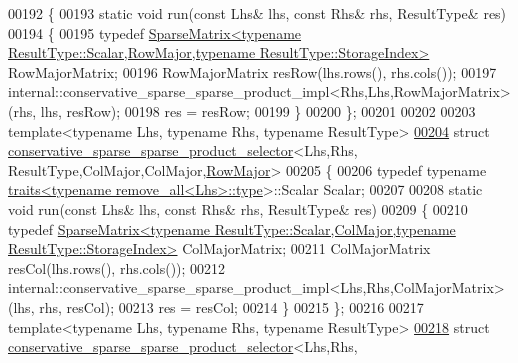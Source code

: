 \begin{DoxyCode}
00192 \{
00193   \textcolor{keyword}{static} \textcolor{keywordtype}{void} run(\textcolor{keyword}{const} Lhs& lhs, \textcolor{keyword}{const} Rhs& rhs, ResultType& res)
00194   \{
00195     \textcolor{keyword}{typedef} 
      \hyperlink{group___sparse_core___module_class_eigen_1_1_sparse_matrix}{SparseMatrix<typename ResultType::Scalar,RowMajor,typename ResultType::StorageIndex>}
       RowMajorMatrix;
00196     RowMajorMatrix resRow(lhs.rows(), rhs.cols());
00197     internal::conservative\_sparse\_sparse\_product\_impl<Rhs,Lhs,RowMajorMatrix>(rhs, lhs, resRow);
00198     res = resRow;
00199   \}
00200 \};
00201 
00202 
00203 \textcolor{keyword}{template}<\textcolor{keyword}{typename} Lhs, \textcolor{keyword}{typename} Rhs, \textcolor{keyword}{typename} ResultType>
\hyperlink{struct_eigen_1_1internal_1_1conservative__sparse__sparse__product__selector_3_01_lhs_00_01_rhs_0f1680f6d2d45917adac59b754c8465e6}{00204} \textcolor{keyword}{struct }\hyperlink{struct_eigen_1_1internal_1_1conservative__sparse__sparse__product__selector}{conservative\_sparse\_sparse\_product\_selector}<Lhs,Rhs,
      ResultType,ColMajor,ColMajor,\hyperlink{group__enums_ggaacded1a18ae58b0f554751f6cdf9eb13acfcde9cd8677c5f7caf6bd603666aae3}{RowMajor}>
00205 \{
00206   \textcolor{keyword}{typedef} \textcolor{keyword}{typename} \hyperlink{struct_eigen_1_1internal_1_1traits}{traits<typename remove\_all<Lhs>::type}>::Scalar 
      Scalar;
00207 
00208   \textcolor{keyword}{static} \textcolor{keywordtype}{void} run(\textcolor{keyword}{const} Lhs& lhs, \textcolor{keyword}{const} Rhs& rhs, ResultType& res)
00209   \{
00210     \textcolor{keyword}{typedef} 
      \hyperlink{group___sparse_core___module_class_eigen_1_1_sparse_matrix}{SparseMatrix<typename ResultType::Scalar,ColMajor,typename ResultType::StorageIndex>}
       ColMajorMatrix;
00211     ColMajorMatrix resCol(lhs.rows(), rhs.cols());
00212     internal::conservative\_sparse\_sparse\_product\_impl<Lhs,Rhs,ColMajorMatrix>(lhs, rhs, resCol);
00213     res = resCol;
00214   \}
00215 \};
00216 
00217 \textcolor{keyword}{template}<\textcolor{keyword}{typename} Lhs, \textcolor{keyword}{typename} Rhs, \textcolor{keyword}{typename} ResultType>
\hyperlink{struct_eigen_1_1internal_1_1conservative__sparse__sparse__product__selector_3_01_lhs_00_01_rhs_0213e811a66030985a0822b6b604bb6aa}{00218} \textcolor{keyword}{struct }\hyperlink{struct_eigen_1_1internal_1_1conservative__sparse__sparse__product__selector}{conservative\_sparse\_sparse\_product\_selector}<Lhs,Rhs,

\end{DoxyCode}
